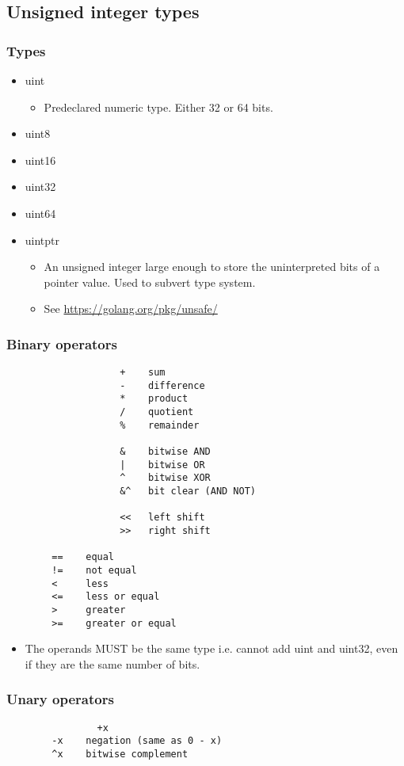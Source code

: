 \documentclass{article}
\begin{document}
	\subsection{Unsigned integer types}	
		\subsubsection{Types}
		\begin{itemize}
    			\item uint
				\begin{itemize}
					\item Predeclared numeric type. Either 32 or 64 bits. 
				\end{itemize}
    			\item uint8
   	 		\item uint16
    			\item uint32
    			\item uint64
    			\item uintptr
				\begin{itemize}
					\item An unsigned integer large enough to store the uninterpreted bits of a pointer value. Used to subvert type system. 
					\item See \url{https://golang.org/pkg/unsafe/}
				\end{itemize}
		\end{itemize}
		\subsubsection{Binary operators}
			\begin{verbatim}
				    +    sum  
				    -    difference   
				    *    product       
				    /    quotient     
				    %    remainder  

				    &    bitwise AND    
				    |    bitwise OR    
				    ^    bitwise XOR   
				    &^   bit clear (AND NOT) 

				    <<   left shift
				    >>   right shift
				    
	    ==    equal
	    !=    not equal
	    <     less
	    <=    less or equal
	    >     greater
	    >=    greater or equal
			\end{verbatim}	
			\begin{itemize}
				\item The operands MUST be the same type i.e. cannot add uint and uint32, even if they are the same number of bits.  
			\end{itemize}
		\subsubsection{Unary operators}
			\begin{verbatim}
		   		+x                     
	    -x    negation (same as 0 - x)
	    ^x    bitwise complement 
			\end{verbatim}
\end{document}

